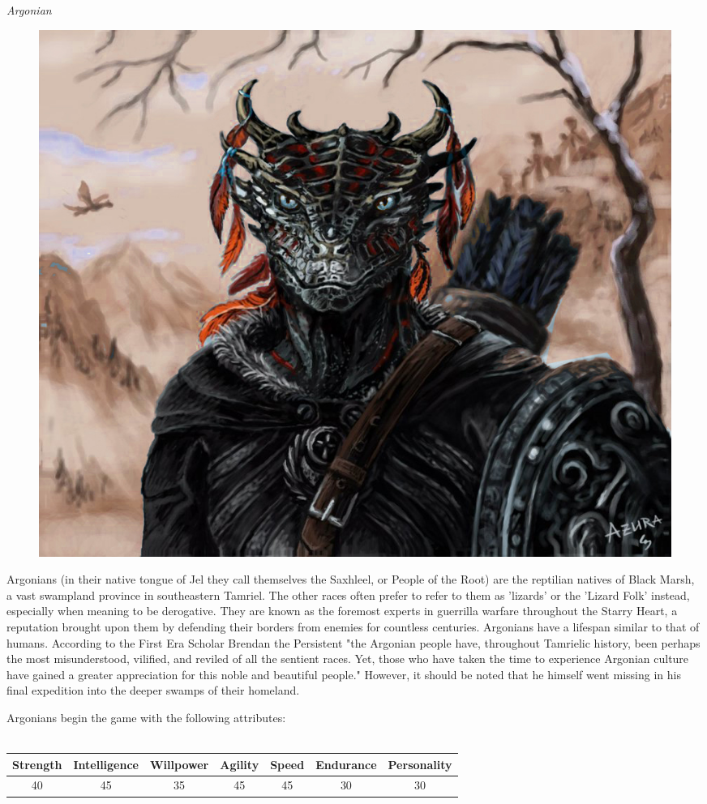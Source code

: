\documentclass[12pt]{article}
\begin{document}
\noindent
\textit{Argonian}
\begin{figure}
	\includegraphics[width=\textwidth]{Argonian.png}
\end{figure}

Argonians (in their native tongue of Jel they call themselves the Saxhleel, or People of the Root) are the reptilian natives of Black Marsh, a vast swampland province in southeastern Tamriel. The other races often prefer to refer to them as 'lizards' or the 'Lizard Folk' instead, especially when meaning to be derogative. They are known as the foremost experts in guerrilla warfare throughout the Starry Heart, a reputation brought upon them by defending their borders from enemies for countless centuries. Argonians have a lifespan similar to that of humans. According to the First Era Scholar Brendan the Persistent "the Argonian people have, throughout Tamrielic history, been perhaps the most misunderstood, vilified, and reviled of all the sentient races. Yet, those who have taken the time to experience Argonian culture have gained a greater appreciation for this noble and beautiful people." However, it should be noted that he himself went missing in his final expedition into the deeper swamps of their homeland.

Argonians begin the game with the following attributes:\\~\\
\begin{tabular}{|c|c|c|c|c|c|c|}
\hline
Strength & Intelligence & Willpower & Agility & Speed & Endurance & Personality\\ \hline
40 & 45 & 35 & 45 & 45 & 30 & 30\\ \hline

\end{tabular}\\
\end{document}

